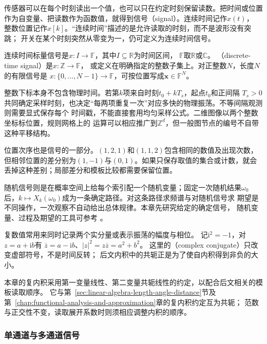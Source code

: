 传感器可以在每个时刻读出一个值，也可以只在约定时刻保留读数。把时间或位置
作为自变量、把读数作为函数值，就得到信号（signal）。连续时间记作$x(t)$，
整数位置记作$x[k]$。“连续时间”描述的是允许读取的时刻，而不是波形没有突跳；
开关在某个时刻突然从零变为一，仍可定义为连续时间信号。

\begin{definition}[信号的索引类型]
  \label{def:signal-index-types}
  连续时间标量信号是$x:I\to\mathbb F$，其中$I\subseteq\mathbb R$为时间区间，
  $\mathbb F$取$\mathbb R$或$\mathbb C$。
  （discrete-time signal）是$x:\mathbb Z\to\mathbb F$，
  或定义在明确指定的整数子集上。对正整数$N$，长度$N$的有限信号是
  $x:\{0,\ldots,N-1\}\to\mathbb F$，可按位置写成$\bm x\in\mathbb F^N$。
\end{definition}

整数下标本身不包含物理时间。若第$k$项来自时刻$t_0+kT_s$，起点$t_0$和正间隔
$T_s>0$共同确定采样时刻，也决定“每两项重复一次”对应多快的物理振荡。不等间隔观测则需要显式保存每个
时间戳，不能直接套用均匀采样公式。二维图像以两个整数坐标标位置，规则网格上的
运算可以相应推广到$\mathbb Z^d$，但一般图节点的编号不自带这种平移结构。

位置次序也是信号的一部分。$(1,2,1)$和$(1,1,2)$包含相同的数值及出现次数，
但相邻位置的差分别为$(1,-1)$与$(0,1)$。如果只保存取值的集合或计数，就会
丢掉这种差别；局部差分和模板比较都需要保留位置。

随机信号则是在概率空间上给每个索引配一个随机变量；固定一次随机结果$\omega_0$
后，$k\mapsto X_k(\omega_0)$成为一条确定路径。对这条路径求频谱与对随机信号求
期望是不同操作，一次观察不自动给出总体规律。本章先研究给定的确定信号，
随机变量、过程及期望的工具可参考
。

复数值常用来同时记录两个实分量或表示振荡的幅度与相位。
记$\mathrm i^2=-1$，对$z=a+\mathrm ib$有
$\overline z=a-\mathrm ib$、$|z|^2=z\overline z=a^2+b^2$。
这里的（complex conjugate）只改变虚部符号，不是时间反转；
后文内积中的共轭正是为了使自内积得到非负的大小。

本章的复内积采用第一变量线性、第二变量共轭线性的约定，以配合后文相关的模板读取顺序。
它与第~\ref{sec:linear-algebra-length-angle-distance}节及
第~\ref{chap:functional-analysis-and-approximation}章的复内积约定互为共轭；
范数与正交性不变，读取展开系数时则须相应调整内积的顺序。

\subsubsection{单通道与多通道信号}


